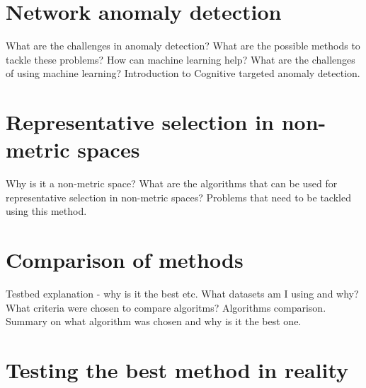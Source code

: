 \documentclass[thesis=B,english]{FITthesis}[2012/10/20]
\begin{document}
%




\chapter{Network anomaly detection}

What are the challenges in anomaly detection?
What are the possible methods to tackle these problems?
How can machine learning help? What are the challenges of using machine learning?
Introduction to Cognitive targeted anomaly detection.

\chapter{Representative selection in non-metric spaces}

Why is it a non-metric space?
What are the algorithms that can be used for representative selection in non-metric spaces?
Problems that need to be tackled using this method.

\chapter{Comparison of methods}

Testbed explanation - why is it the best etc.
What datasets am I using and why?
What criteria were chosen to compare algoritms?
Algorithms comparison.
Summary on what algorithm was chosen and why is it the best one.

\chapter{Testing the best method in reality}
\end{document}
